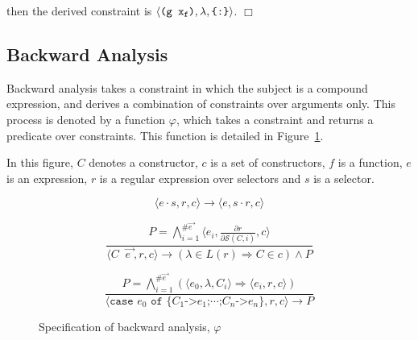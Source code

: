 \documentclass[preprint]{sigplanconf}
\newcommand{\T}[1]{\texttt{#1}}
\newcommand{\tup}[1]{\ensuremath{\langle #1 \rangle}}
\newcommand{\noexample}{\hfill$\Box$}
\newcommand{\D}{\ensuremath{\cdot}} %
\renewcommand{\c}[3]{\tup{\T{#1},\T{#2},\T{\{#3\}}}}
\newcommand{\cc}[2]{\c{#1}{$\lambda$}{#2}}
\newcommand{\s}[1]{\ensuremath{_{\tt #1}}} %
\newcommand{\vecto}[1]{\overrightarrow{#1\;}}
\newcommand{\gap}{\;\;}
\begin{document}
\noindent then the derived constraint is \cc{(g x\s{f})}{:}.
\noexample

\subsection{Backward Analysis}
\label{sec:backward}

Backward analysis takes a constraint in which the subject is a
compound expression, and derives a combination of constraints over
arguments only. This process is denoted by a function $\varphi$,
which takes a constraint and returns a predicate over constraints.
This function is detailed in Figure~\ref{fig:backward}.

In this figure, $C$ denotes a constructor, $c$ is a set of
constructors, $f$ is a function, $e$ is an expression, $r$ is a
regular expression over selectors and $s$ is a selector.

\begin{figure}

\renewcommand\theequation{sel}
\begin{equation}
    \tup{e\D{}s,r,c} \rightarrow
    \tup{e,s\D{}r,c}
\end{equation}

\renewcommand\theequation{con}
\begin{equation}
\frac
    {
        P =
        \bigwedge_{i=1}^{\#\vecto{e}}
        \tup{e_i,\frac{\partial r}{\partial \mathcal{S}(C,i)},c}
    }
    {
        \tup{C \gap \vecto{e},r,c}
        \rightarrow (\lambda \in L(r) \Rightarrow C \in c) \wedge P
    }
\end{equation}

\renewcommand\theequation{cas}
\begin{equation}
\frac
    {
        P =
        \bigwedge_{i=1}^{\#\vecto{e}}
        (
            \tup{e_0,\lambda,C_i}
            \Rightarrow
            \tup{e_i,r,c}
        )
    }
    {
        \tup{\T{case } e_0 \T{ of \{}C_1 \T{->} e_1\T{;} \cdots
        \T{;} C_n \T{->} e_n \},r,c} \rightarrow P
    }
\end{equation}

\caption{Specification of backward analysis, $\varphi$} %
\label{fig:backward}
\end{figure}
\end{document}
